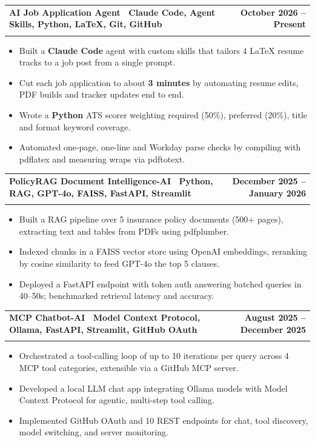 \documentclass[letterpaper,11pt]{article}
\makeatletter
\newcommand{\resumeItem}[1]{\item\small{#1 \vspace{-4pt}}}
\newcommand{\resumeSubheading}[4]{
    \vspace{-2pt}\item
    \begin{tabular*}{1.0\textwidth}[t]{l@{\extracolsep{\fill}}r}
        \textbf{#1} & \textbf{\small #2} \\
        \textit{\small#3} & \textit{\small #4}
    \end{tabular*}\vspace{-7pt}
}
\newcommand{\resumeItemListStart}{\begin{itemize}}
\newcommand{\resumeItemListEnd}{\end{itemize}\vspace{-7pt}}
\makeatother
\begin{document}
\resumeSubheading
{\textbf{AI Job Application Agent} \textnormal{\textbar\ {Claude Code, Agent Skills, Python, LaTeX, Git, GitHub}}}{October 2026 -- Present}{}{}
\vspace{-0.6cm}
\resumeItemListStart
\resumeItem{Built a \textbf{Claude Code} agent with custom skills that tailors 4 LaTeX resume tracks to a job post from a single prompt.}
\vspace{0.15cm}
\resumeItem{Cut each job application to about \textbf{3 minutes} by automating resume edits, PDF builds and tracker updates end to end.}
\vspace{0.15cm}
\resumeItem{Wrote a \textbf{Python} ATS scorer weighting required (50\%), preferred (20\%), title and format keyword coverage.}
\vspace{0.15cm}
\resumeItem{Automated one-page, one-line and Workday parse checks by compiling with pdflatex and measuring wraps via pdftotext.}
\vspace{0.15cm}
\resumeItemListEnd

\resumeSubheading
{\textbf{PolicyRAG Document Intelligence-AI} \textnormal{\textbar\ {Python, RAG, GPT-4o, FAISS, FastAPI, Streamlit}}}{December 2025 -- January 2026}{}{}
\vspace{-0.6cm}
\resumeItemListStart

\resumeItem{Built a RAG pipeline over 5 insurance policy documents (500+ pages), extracting text and tables from PDFs using pdfplumber.}
\vspace{0.15cm}
\resumeItem{Indexed chunks in a FAISS vector store using OpenAI embeddings, reranking by cosine similarity to feed GPT-4o the top 5 clauses.}
\vspace{0.15cm}
\resumeItem{Deployed a FastAPI endpoint with token auth answering batched queries in 40--50s; benchmarked retrieval latency and accuracy.}
\vspace{0.15cm}
\resumeItemListEnd

\resumeSubheading
{\textbf{MCP Chatbot-AI} \textnormal{\textbar\ {Model Context Protocol, Ollama, FastAPI, Streamlit, GitHub OAuth}}}{August 2025 -- December 2025}{}{}
\vspace{-0.6cm}
\resumeItemListStart

\resumeItem{Orchestrated a tool-calling loop of up to 10 iterations per query across 4 MCP tool categories, extensible via a GitHub MCP server.}
\vspace{0.15cm}
\resumeItem{Developed a local LLM chat app integrating Ollama models with Model Context Protocol for agentic, multi-step tool calling.}
\vspace{0.15cm}
\resumeItem{Implemented GitHub OAuth and 10 REST endpoints for chat, tool discovery, model switching, and server monitoring.}
\vspace{0.15cm}
\resumeItemListEnd
\end{document}

